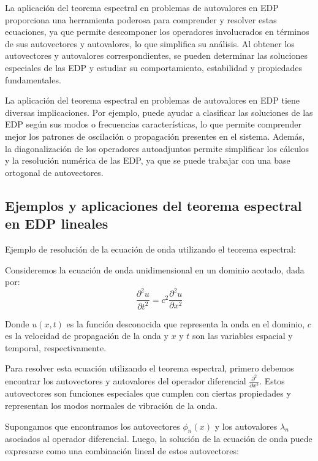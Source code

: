 \documentclass{article}
\begin{document}
    La aplicación del teorema espectral en problemas de autovalores en EDP proporciona una herramienta poderosa para comprender y resolver estas ecuaciones, ya que permite descomponer los operadores involucrados en términos de sus autovectores y autovalores, lo que simplifica su análisis. Al obtener los autovectores y autovalores correspondientes, se pueden determinar las soluciones especiales de las EDP y estudiar su comportamiento, estabilidad y propiedades fundamentales.

    La aplicación del teorema espectral en problemas de autovalores en EDP tiene diversas implicaciones. Por ejemplo, puede ayudar a clasificar las soluciones de las EDP según sus modos o frecuencias características, lo que permite comprender mejor los patrones de oscilación o propagación presentes en el sistema. Además, la diagonalización de los operadores autoadjuntos permite simplificar los cálculos y la resolución numérica de las EDP, ya que se puede trabajar con una base ortogonal de autovectores.

    \subsection{Ejemplos y aplicaciones del teorema espectral en EDP lineales}
    Ejemplo de resolución de la ecuación de onda utilizando el teorema espectral:

    Consideremos la ecuación de onda unidimensional en un dominio acotado, dada por:
    \begin{equation}
    \frac{{\partial^2 u}}{{\partial t^2}} = c^2 \frac{{\partial^2 u}}{{\partial x^2}}
    \end{equation}

    Donde \(u(x, t)\) es la función desconocida que representa la onda en el dominio, \(c\) es la velocidad de propagación de la onda y \(x\) y \(t\) son las variables espacial y temporal, respectivamente.
    
    Para resolver esta ecuación utilizando el teorema espectral, primero debemos encontrar los autovectores y autovalores del operador diferencial \(\frac{{\partial^2}}{{\partial x^2}}\). Estos autovectores son funciones especiales que cumplen con ciertas propiedades y representan los modos normales de vibración de la onda.
    
    Supongamos que encontramos los autovectores \(\phi_n(x)\) y los autovalores \(\lambda_n\) asociados al operador diferencial. Luego, la solución de la ecuación de onda puede expresarse como una combinación lineal de estos autovectores:
    
\end{document}
